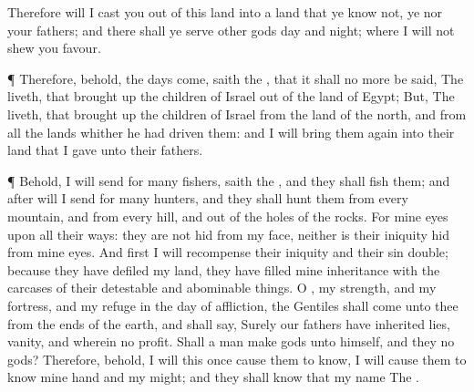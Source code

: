 {Therefore will I
cast you out of this
land into a
land that ye
know not,
{} ye nor your
fathers; and there shall ye
serve
other
gods
day and
night; where I will not
shew you
favour.
\par }{\PP {}¶ Therefore, behold, the
days
come,
saith the
{}, that it shall no more be
said, The
{}
liveth, that brought
up the
children of
Israel out of the
land of
Egypt;
But, The
{}
liveth, that brought
up the
children of
Israel from the
land of the
north, and from all the
lands whither he had
driven them: and I will bring them
again into their
land that I
gave unto their
fathers.
\par }{\PP {}¶ Behold, I will
send for
many
fishers,
saith the
{}, and they shall
fish them; and
after will I
send for
many
hunters, and they shall
hunt them from every
mountain, and from every
hill, and out of the
holes of the
rocks.
For mine
eyes
{} upon all their
ways: they are not
hid from my
face, neither is their
iniquity
hid
from mine
eyes.
And
first I will
recompense their
iniquity and their
sin
double; because they have
defiled my
land, they have
filled mine
inheritance with the
carcases of their
detestable and abominable
things.
O
{}, my
strength, and my
fortress, and my
refuge in the
day of
affliction, the
Gentiles shall
come unto thee from the
ends of the
earth, and shall
say, Surely our
fathers have
inherited
lies,
vanity, and
{} wherein
{} no
profit.
Shall a
man
make
gods unto himself, and they
{} no
gods?
Therefore, behold, I will this
once cause them to
know, I will cause them to
know mine
hand and my
might; and they shall
know that my
name
{} The
{}.

}

